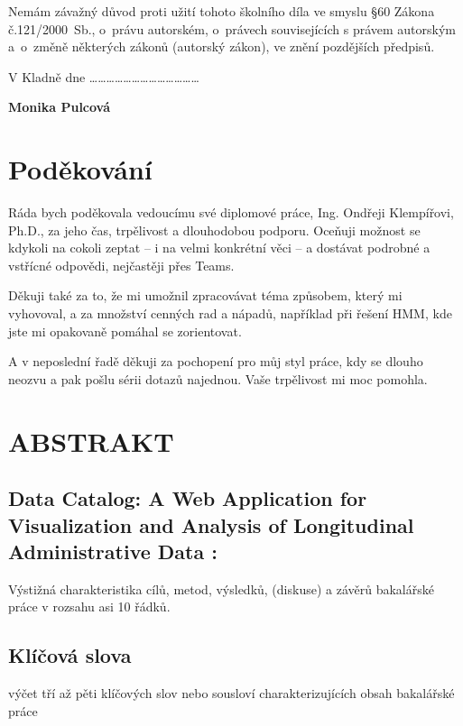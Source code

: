 \documentclass[a4paper,12pt]{article}   %
\numberwithin{equation}{section}        %
\newcommand{\autor}{Monika Pulcová}
\newcommand{\nazev}{Data Catalog: A Web Application for Visualization and Analysis of Longitudinal Administrative Data }
\begin{document}
    \hspace{-0.75cm}Nemám závažný důvod proti užití tohoto školního díla ve smyslu \S 60 Zákona č.121/2000~Sb., o~právu autorském, o~právech souvisejících s právem autorským a~o~změně některých zákonů (autorský zákon), ve znění pozdějších předpisů. 
    
    \vspace{1em}
    
    \hspace{-0.75cm}V Kladně dne \ldots \ldots \ldots \hfill \ldots \ldots \ldots \ldots \ldots \ldots \ldots \ldots \ldots \ldots

    \hspace{10cm} \textbf{\autor}

	\clearpage
	
	\null\vfill
	\section*{Poděkování}
Ráda bych poděkovala vedoucímu své diplomové práce, Ing. Ondřeji Klempířovi, Ph.D., za jeho čas, trpělivost a dlouhodobou podporu. Oceňuji možnost se kdykoli na cokoli zeptat – i na velmi konkrétní věci – a dostávat podrobné a vstřícné odpovědi, nejčastěji přes Teams.

Děkuji také za to, že mi umožnil zpracovávat téma způsobem, který mi vyhovoval, a za množství cenných rad a nápadů, například při řešení HMM, kde jste mi opakovaně pomáhal se zorientovat.

A v neposlední řadě děkuji za pochopení pro můj styl práce, kdy se dlouho neozvu a pak pošlu sérii dotazů najednou. Vaše trpělivost mi moc pomohla.

    \clearpage	

	
	\null\vfill	
	\section*{ABSTRAKT}
        \subsection*{\nazev:}
	    Výstižná charakteristika cílů, metod, výsledků, (diskuse) a závěrů bakalářské práce v rozsahu asi 10 řádků. 
	\subsection*{Klíčová slova}
		výčet tří až pěti klíčových slov nebo sousloví charakterizujících obsah bakalářské práce
	\clearpage
		
\end{document}
